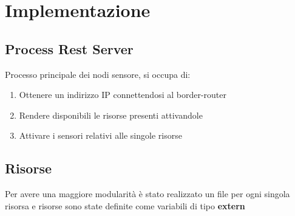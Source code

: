   \section{Implementazione}
    \subsection{Process Rest Server}
      Processo principale dei nodi sensore, si occupa di:
      \begin{enumerate}
        \item Ottenere un indirizzo IP connettendosi al border-router
        \item Rendere disponibili le risorse presenti attivandole
        \item Attivare i sensori relativi alle singole risorse
      \end{enumerate}


      

    \subsection{Risorse}
      Per avere una maggiore modularità è stato realizzato un file per ogni singola risorsa e risorse sono state definite come variabili di tipo \textbf{extern}

      

